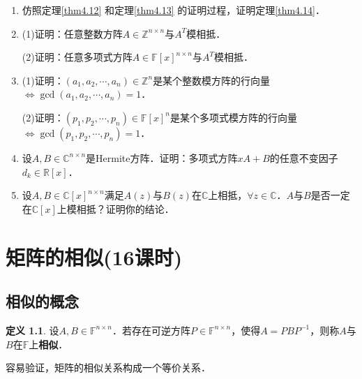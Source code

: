 \documentclass[a4paper,fontset=windows]{ctexbook}
\theoremstyle{definition}
\newtheorem{definition}{定义}[chapter]
\begin{document}
\begin{enumerate}
(3) 推广习题4和习题5的结论至$\mathbb{F}[x]$上的模方阵．

\item 仿照定理\ref{thm4.12} 和定理\ref{thm4.13} 的证明过程，证明定理\ref{thm4.14}．

\item (1)证明：任意整数方阵$A\in\mathbb{Z}^{n\times n}$与$A^T$模相抵．

(2)证明：任意多项式方阵$A\in\mathbb{F}[x]^{n\times n}$与$A^T$模相抵．

\item (1)证明：$(a_1,a_2,\cdots,a_n)\in\mathbb{Z}^n$是某个整数模方阵的行向量$\Leftrightarrow\gcd(a_1,a_2,\cdots,a_n)=1$．

(2)证明：$(p_1,p_2,\cdots,p_n)\in\mathbb{F}[x]^n$是某个多项式模方阵的行向量$\Leftrightarrow\gcd(p_1,p_2,\cdots,p_n)=1$．

\item 设$A,B\in\mathbb{C}^{n\times n}$是Hermite方阵．证明：多项式方阵$xA+B$的任意不变因子$d_k\in\mathbb{R}[x]$．

\item 设$A,B\in\mathbb{C}[x]^{n\times n}$满足$A(z)$与$B(z)$在$\mathbb{C}$上相抵，$\forall z\in\mathbb{C}$．$A$与$B$是否一定在$\mathbb{C}[x]$上模相抵？证明你的结论．

\end{enumerate}

\chapter{矩阵的相似(16课时)}%

\section{相似的概念}

\begin{definition}
设$A,B\in\mathbb{F}^{n\times n}$．若存在可逆方阵$P\in\mathbb{F}^{n\times n}$，使得$A=PBP^{-1}$，则称$A$与$B$在$\mathbb{F}$上{\bf 相似}．
\end{definition}

容易验证，矩阵的相似关系构成一个等价关系．
\end{document}
